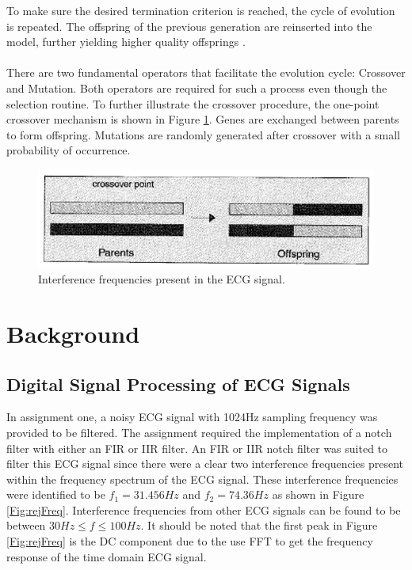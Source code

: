 \documentclass[a4paper, 11pt]{article}
\begin{document}
    To make sure the desired termination criterion is reached, the cycle of evolution is repeated. The offspring of 
    the previous generation are reinserted into the model, further yielding higher quality offsprings \cite{Man1997}.
    \\\\
    There are two fundamental operators that facilitate the evolution cycle: Crossover and Mutation. Both operators 
    are required for such a process even though the selection routine. To further illustrate the crossover procedure, 
    the one-point crossover mechanism is shown in Figure \ref{Fig:crossover}. Genes are exchanged between parents to form 
    offspring. Mutations are randomly generated after crossover with a small probability of occurrence.
    
    \begin{figure}[h!]
        \centering
        \graphicspath{{./wiki/}}
        \includegraphics[scale=0.7]{crossover.png}
        \caption{Interference frequencies present in the ECG signal.}
        \label{Fig:crossover}
    \end{figure}

\section{Background}\label{sec:bg}
    \subsection{Digital Signal Processing of ECG Signals}\label{sec:bg_sub1}
        In assignment one, a noisy ECG signal with 1024Hz sampling frequency was provided to be filtered. 
        The assignment required the implementation of a notch filter with either an FIR or IIR filter.
        An FIR or IIR notch filter was suited to filter this ECG signal since there were a clear two 
        interference frequencies present within the frequency spectrum of the ECG signal.
        These interference frequencies were identified to be $f_{1} = 31.456Hz$ and $f_{2} = 74.36Hz$
        as shown in Figure \ref{Fig:rejFreq}. Interference frequencies from other ECG signals can be found to
        be between $30Hz \leqslant f \leqslant 100Hz$. It should be noted that the first peak in Figure \ref{Fig:rejFreq} is the 
        DC component due to the use FFT to get the frequency response of the time domain ECG signal.
        
\end{document}
